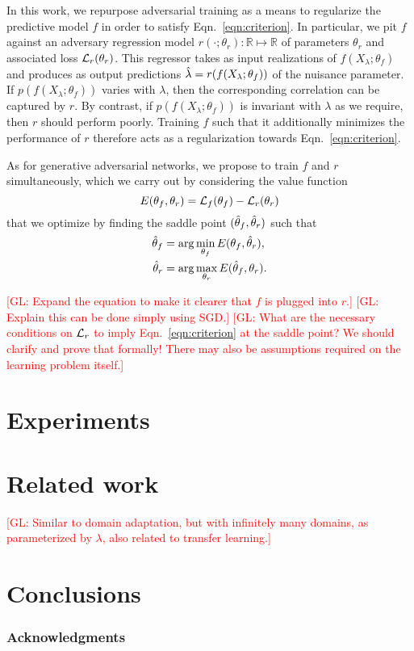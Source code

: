 \documentclass{article}
\newcommand{\glnote}[1]{\textcolor{red}{[GL: #1]}}
\theoremstyle{plain}
\begin{document}
In this work, we repurpose adversarial training as a means to regularize the
predictive model $f$ in order to satisfy Eqn.~\ref{eqn:criterion}. In
particular, we pit $f$ against an adversary regression model $r(\cdot ;
\theta_r) : \mathbb{R} \mapsto \mathbb{R}$ of parameters $\theta_r$ and
associated loss ${\cal L}_r(\theta_r)$. This regressor takes as input realizations of $f(X_\lambda; \theta_f)$
and produces as output predictions $\smash{\hat\lambda} = r(f(X_\lambda; \theta_f))$
of the nuisance parameter. If $p(f(X_\lambda; \theta_f))$ varies with $\lambda$,
then the corresponding correlation can be captured by $r$. By contrast, if
$p(f(X_\lambda; \theta_f))$ is invariant with $\lambda$ as we require, then $r$
should perform poorly. Training $f$ such that it additionally minimizes the performance of $r$
therefore acts as a regularization towards Eqn.~\ref{eqn:criterion}.

As for generative adversarial networks, we propose to
train $f$ and $r$ simultaneously, which we carry out by considering
the value function
\begin{equation}
    E(\theta_f, \theta_r) = {\cal L}_f(\theta_f) - {\cal L}_r(\theta_r)
\end{equation}
that we optimize by finding the saddle point $(\smash{\hat\theta_f}, \smash{\hat\theta_r})$ such that
\begin{align}
    \smash{\hat\theta_f} &= \arg \min_{\theta_f} E(\theta_f, \smash{\hat\theta_r}), \\
    \smash{\hat\theta_r} &= \arg \max_{\theta_r} E(\smash{\hat\theta_f}, \theta_r).
\end{align}

\glnote{Expand the equation to make it clearer that $f$ is plugged into $r$.}
\glnote{Explain this can be done simply using SGD.}
\glnote{What are the necessary conditions on ${\cal L}_r$ to imply
Eqn.~\ref{eqn:criterion} at the saddle point? We should clarify and prove that
formally! There may also be assumptions required on the learning problem itself.}

\section{Experiments}

\section{Related work}

\glnote{Similar to domain adaptation, but with infinitely many domains,
as parameterized by $\lambda$, also related to transfer learning.}

\section{Conclusions}

\subsubsection*{Acknowledgments}


{\small
}
\end{document}
